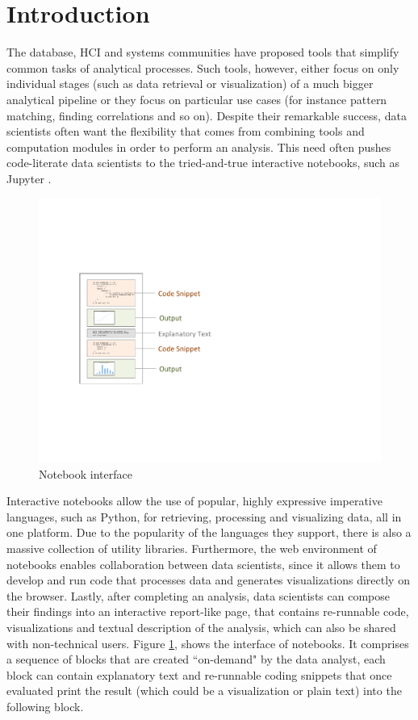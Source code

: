 \section{Introduction}
\label{section:introduction}




The database, HCI and systems communities have proposed tools that simplify common tasks of analytical processes. Such tools, however, either focus on only individual stages (such as data retrieval or visualization) of a much bigger analytical pipeline or they focus on particular use cases (for instance pattern matching, finding correlations and so on). Despite their remarkable success, data scientists often want the flexibility that comes from combining tools and computation modules in order to perform an analysis. This need often pushes code-literate data scientists to the tried-and-true interactive notebooks, such as Jupyter \cite{Jupyter}.


\begin{figure}[t]
  \centering
  \includegraphics[width=0.7\columnwidth]{figures/notebook2.pdf}
  \caption{Notebook interface}
  \vspace{-10pt}
\label{figure:notebook-interface}
\end{figure}

Interactive notebooks allow the use of popular, highly expressive imperative languages, such as Python, for retrieving, processing and visualizing data, all in one platform. Due to the popularity of the languages they support, there is also a massive collection of utility libraries. Furthermore, the web environment of notebooks enables collaboration between data scientists, since it allows them to develop and run code that processes data and generates visualizations directly on the browser. Lastly, after completing an analysis, data scientists can compose their findings into an interactive report-like page, that contains re-runnable code, visualizations and textual description of the analysis, which can also be shared with non-technical users. Figure \ref{figure:notebook-interface}, shows the interface of notebooks. It comprises a sequence of blocks that are created ``on-demand" by the data analyst, each block can contain explanatory text and re-runnable coding snippets that once evaluated print the result (which could be a visualization or plain text) into the following block. 

